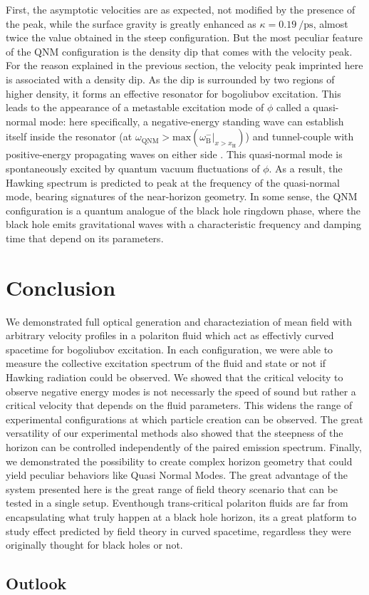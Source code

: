 First, the asymptotic velocities are as expected, not modified by the presence of the peak, while the surface gravity 
is greatly enhanced as $\kappa = \SI{0.19}{\per \pico \second}$, almost twice the value obtained in the steep configuration.
But the most peculiar feature of the QNM configuration is the density dip that comes with the velocity peak. For the reason explained in the previous section,
the velocity peak imprinted here is associated with a density dip. As the dip is surrounded by two regions of higher density, it forms an effective resonator for bogoliubov excitation.
This leads to the appearance of a metastable excitation mode of $\phi$ called a quasi-normal mode: here specifically, a negative-energy standing wave can establish itself inside the resonator (at $\omega_\mathrm{QNM}>\mathrm{max}(\omega_\mathrm{B}^-|_{x>x_\mathrm{H}})$) and tunnel-couple with positive-energy propagating waves on either side \cite{jacquet_quantum_2023}.
This quasi-normal mode is spontaneously excited by quantum vacuum fluctuations of $\phi$.
As a result, the Hawking spectrum is predicted to peak at the frequency of the quasi-normal mode, bearing signatures of the near-horizon geometry. 
In some sense, the QNM configuration is a quantum analogue of the black hole ringdown phase, where the black hole emits gravitational waves with a characteristic frequency and damping time \cite{brito_gravitational_2015} that depend on its parameters. 


\section{Conclusion}

We demonstrated full optical generation and characteziation of mean field with arbitrary velocity profiles in a polariton fluid which act as effectivly curved spacetime for 
bogoliubov excitation. In each
configuration, we were able to measure the collective excitation spectrum of the fluid and state or not if Hawking radiation could be observed. We showed that the critical velocity to observe negative energy modes is not necessarly the speed of sound but rather a critical velocity 
that depends on the fluid parameters. This widens the range of experimental configurations at which particle creation can be observed. The great versatility of our experimental methods also showed that the steepness of the horizon can be controlled independently of the paired emission spectrum.
Finally, we demonstrated the possibility to create complex horizon geometry that could yield peculiar behaviors like Quasi Normal Modes. The great 
advantage of the system presented here is the great range of field theory scenario that can be tested in a single setup. Eventhough
 trans-critical polariton fluids are far from encapsulating what truly happen at a black hole horizon, its a great platform to study effect predicted by field theory in curved spacetime, regardless they were
originally thought for black holes or not.

\subsection{Outlook}
